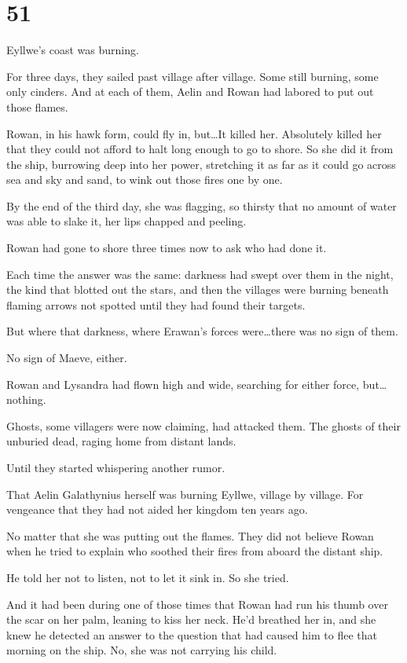 
\chapter{51}

Eyllwe's coast was burning.

For three days, they sailed past village after village.
Some still burning, some only cinders.
And at each of them, Aelin and Rowan had labored to put out those flames.

Rowan, in his hawk form, could fly in, but\ldots It killed her.
Absolutely killed her that they could not afford to halt long enough to go to shore.
So she did it from the ship, burrowing deep into her power, stretching it as far as it could go across sea and sky and sand, to wink out those fires one by one.

By the end of the third day, she was flagging, so thirsty that no amount of water was able to slake it, her lips chapped and peeling.

Rowan had gone to shore three times now to ask who had done it.

Each time the answer was the same: darkness had swept over them in the night, the kind that blotted out the stars, and then the villages were burning beneath flaming arrows not spotted until they had found their targets.

But where that darkness, where Erawan's forces were\ldots there was no sign of them.

No sign of Maeve, either.

Rowan and Lysandra had flown high and wide, searching for either force, but\ldots nothing.

Ghosts, some villagers were now claiming, had attacked them.
The ghosts of their unburied dead, raging home from distant lands.

Until they started whispering another rumor.

That Aelin Galathynius herself was burning Eyllwe, village by village.
For vengeance that they had not aided her kingdom ten years ago.

No matter that she was putting out the flames.
They did not believe Rowan when he tried to explain who soothed their fires from aboard the distant ship.

He told her not to listen, not to let it sink in.
So she tried.

And it had been during one of those times that Rowan had run his thumb over the scar on her palm, leaning to kiss her neck.
He'd breathed her in, and she knew he detected an answer to the question that had caused him to flee that morning on the ship.
No, she was not carrying his child.

